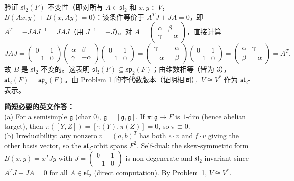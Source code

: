 \documentclass{ctexart}
\begin{document}
验证 $\mathfrak{sl}_{2}(F)$-不变性（即对所有 $A \in \mathfrak{sl}_2$ 和 $x, y \in V$，$B(Ax, y) + B(x, Ay) = 0$）：该条件等价于 $A^{T} J + J A = 0$，即 $A^{T} = -J A J^{-1} = J A J$（用 $J^{-1} = -J$）。对 $A = \begin{pmatrix} \alpha & \beta \\ \gamma & -\alpha \end{pmatrix}$，直接计算
\[
J A J = \begin{pmatrix} 0 & 1 \\ -1 & 0 \end{pmatrix} \begin{pmatrix} \alpha & \beta \\ \gamma & -\alpha \end{pmatrix} \begin{pmatrix} 0 & 1 \\ -1 & 0 \end{pmatrix} = \begin{pmatrix} \gamma & -\alpha \\ -\alpha & -\beta \end{pmatrix} \begin{pmatrix} 0 & 1 \\ -1 & 0 \end{pmatrix} = \begin{pmatrix} \alpha & \gamma \\ \beta & -\alpha \end{pmatrix} = A^{T}.
\]
故 $B$ 是 $\mathfrak{sl}_2$-不变的。这表明 $\mathfrak{sl}_{2}(F) \subseteq \mathfrak{sp}_{2}(F)$；由维数相等（皆为 $3$），$\mathfrak{sl}_{2}(F) = \mathfrak{sp}_{2}(F)$。由 Problem 1 的李代数版本（证明相同），$V \cong V^{*}$ 作为 $\mathfrak{sl}_2$-表示。

\vspace{1em}
\textbf{简短必要的英文作答：}\\
(a) For a semisimple $\mathfrak{g}$ (char $0$), $\mathfrak{g}=[\mathfrak{g},\mathfrak{g}]$. If $\pi:\mathfrak{g}\to F$ is $1$-dim (hence abelian target), then $\pi([Y,Z])=[\pi(Y),\pi(Z)]=0$, so $\pi\equiv 0$.\\
(b) Irreducibility: any nonzero $v=(a,b)^T$ has both $e\cdot v$ and $f\cdot v$ giving the other basis vector, so the $\mathfrak{sl}_2$-orbit spans $F^2$. Self-dual: the skew-symmetric form $B(x,y)=x^T J y$ with $J=\begin{pmatrix}0&1\\-1&0\end{pmatrix}$ is non-degenerate and $\mathfrak{sl}_2$-invariant since $A^T J + J A = 0$ for all $A\in\mathfrak{sl}_2$ (direct computation). By Problem~1, $V\cong V^*$.
\end{document}
